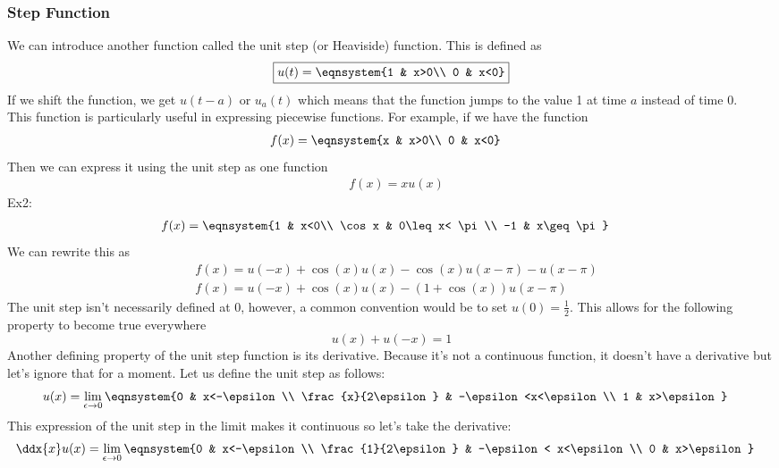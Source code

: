 \subsubsection{Step Function}
We can introduce another function called the unit step (or Heaviside) function. This is defined as
$$\boxed{u(t)=\eqnsystem{1 & x>0\\ 0 & x<0}}$$
If we shift the function, we get $u(t-a)$ or $u_a(t)$ which means that the function jumps to the value 1 at time $a$ instead of time 0.\\
This function is particularly useful in expressing piecewise functions. For example, if we have the function
\begin{align*}
    &f(x)=\eqnsystem{x & x>0\\ 0 & x<0}
\end{align*}
Then we can express it using the unit step as one function
\begin{align*}
    &f(x)=xu(x)
\end{align*}
Ex2:
\begin{align*}
    &f(x)=\eqnsystem{1 & x<0\\ \cos x & 0\leq x< \pi\\ -1 & x\geq \pi}
\end{align*}
We can rewrite this as
\begin{align*}
    &f(x)=u(-x)+\cos(x)u(x)-\cos(x)u(x-\pi)-u(x-\pi)\\
    &f(x)=u(-x)+\cos(x)u(x)-(1+\cos(x))u(x-\pi)
\end{align*}
The unit step isn't necessarily defined at 0, however, a common convention would be to set $u(0)=\frac{1}{2}$. This allows for the following property to become true everywhere
$$u(x)+u(-x)=1$$
Another defining property of the unit step function is its derivative. Because it's not a continuous function, it doesn't have a derivative but let's ignore that for a moment. Let us define the unit step as follows:
\begin{align*}
    &u(x)=\lim_{\epsilon\to0}\eqnsystem{0 & x<-\epsilon\\ \frac{x}{2\epsilon} & -\epsilon<x<\epsilon\\ 1 & x>\epsilon}
\end{align*}
This expression of the unit step in the limit makes it continuous so let's take the derivative:
\begin{align*}
    &\ddx{x}u(x)=\lim_{\epsilon\to0}\eqnsystem{0 & x<-\epsilon\\ \frac{1}{2\epsilon} & -\epsilon< x<\epsilon\\ 0 & x>\epsilon}
\end{align*}
